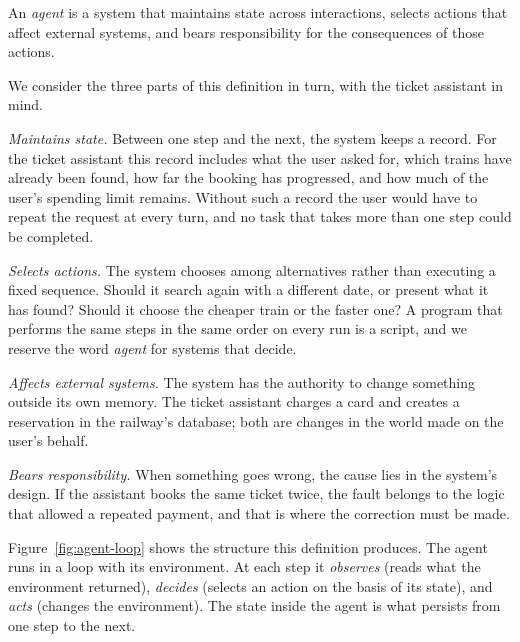 \documentclass[11pt]{book}
\begin{document}
An \emph{agent} is a system that maintains state across interactions, selects actions that affect external systems, and bears responsibility for the consequences of those actions.

We consider the three parts of this definition in turn, with the ticket assistant in mind.

\textit{Maintains state.} Between one step and the next, the system keeps a record. For the ticket assistant this record includes what the user asked for, which trains have already been found, how far the booking has progressed, and how much of the user's spending limit remains. Without such a record the user would have to repeat the request at every turn, and no task that takes more than one step could be completed.

\textit{Selects actions.} The system chooses among alternatives rather than executing a fixed sequence. Should it search again with a different date, or present what it has found? Should it choose the cheaper train or the faster one? A program that performs the same steps in the same order on every run is a script, and we reserve the word \textit{agent} for systems that decide.

\textit{Affects external systems.} The system has the authority to change something outside its own memory. The ticket assistant charges a card and creates a reservation in the railway's database; both are changes in the world made on the user's behalf.

\textit{Bears responsibility.} When something goes wrong, the cause lies in the system's design. If the assistant books the same ticket twice, the fault belongs to the logic that allowed a repeated payment, and that is where the correction must be made.

Figure~\ref{fig:agent-loop} shows the structure this definition produces. The agent runs in a loop with its environment. At each step it \textit{observes} (reads what the environment returned), \textit{decides} (selects an action on the basis of its state), and \textit{acts} (changes the environment). The state inside the agent is what persists from one step to the next.
\end{document}
